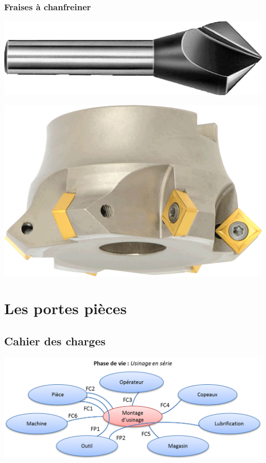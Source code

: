 \documentclass[11pt,oneside]{article}
\begin{document}
\subsubsection{Fraises à chanfreiner}

\begin{minipage}[c]{.45\linewidth}
\begin{center}
\includegraphics[width=.7\textwidth]{png/fr_chanfrein}
\end{center}
\end{minipage} \hfill
\begin{minipage}[c]{.45\linewidth}
\begin{center}
\includegraphics[width=.6\textwidth]{png/fr_chanfrein_2}
\end{center}
\end{minipage}

\section{Les portes pièces}
\subsection{Cahier des charges}

\begin{center}
\includegraphics[width=.95\textwidth]{png/af1}
\end{center}
\end{document}
